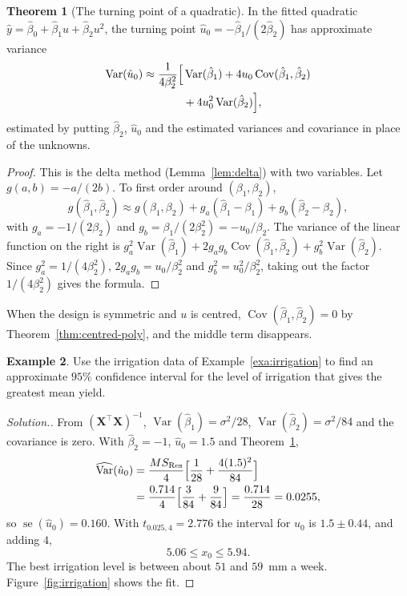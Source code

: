\documentclass[11pt,a4paper]{article}
\numberwithin{equation}{section}
\theoremstyle{definition}
\newtheorem{thm}{Theorem}[subsection]
\newtheorem{exa}[thm]{Example}
\newenvironment{solution}
  {\renewcommand{\qedsymbol}{}\begin{proof}[\textit{Solution}.]}
  {\end{proof}}
\begin{document}
\begin{thm}[The turning point of a quadratic]\label{thm:turning}
In the fitted quadratic $\hat y = \hat\beta_0 + \hat\beta_1u + \hat\beta_2u^2$, the turning point $\hat u_0 = -\hat\beta_1/(2\hat\beta_2)$ has
approximate variance
\begin{align*}
\operatorname{Var}(\hat u_0) \approx \frac{1}{4\beta_2^2}\Bigl[&\operatorname{Var}(\hat\beta_1) + 4u_0\operatorname{Cov}(\hat\beta_1, \hat\beta_2) \\
&+ 4u_0^2\operatorname{Var}(\hat\beta_2)\Bigr] ,
\end{align*}
estimated by putting $\hat\beta_2$, $\hat u_0$ and the estimated variances and covariance in place of the unknowns.
\end{thm}

\begin{proof}
This is the delta method (Lemma~\ref{lem:delta}) with two variables. Let $g(a, b) = -a/(2b)$. To first order
around $(\beta_1, \beta_2)$,
\[
g(\hat\beta_1, \hat\beta_2) \approx g(\beta_1, \beta_2) + g_a(\hat\beta_1 - \beta_1) + g_b(\hat\beta_2 - \beta_2) ,
\]
with $g_a = -1/(2\beta_2)$ and $g_b = \beta_1/(2\beta_2^2) = -u_0/\beta_2$. The variance of the linear function on the right is
$g_a^2\operatorname{Var}(\hat\beta_1) + 2g_ag_b\operatorname{Cov}(\hat\beta_1, \hat\beta_2) + g_b^2\operatorname{Var}(\hat\beta_2)$. Since
$g_a^2 = 1/(4\beta_2^2)$, $2g_ag_b = u_0/\beta_2^2$ and $g_b^2 = u_0^2/\beta_2^2$, taking out the factor $1/(4\beta_2^2)$ gives the formula.
\end{proof}

When the design is symmetric and $u$ is centred, $\operatorname{Cov}(\hat\beta_1, \hat\beta_2) = 0$ by Theorem~\ref{thm:centred-poly}, and the middle
term disappears.

\begin{exa}\label{exa:irrigation-max}
Use the irrigation data of Example~\ref{exa:irrigation} to find an approximate $95\%$ confidence
interval for the level of irrigation that gives the greatest mean yield.
\end{exa}

\begin{solution}
From $(\mathbf{X}^\top\mathbf{X})^{-1}$, $\operatorname{Var}(\hat\beta_1) = \sigma^2/28$, $\operatorname{Var}(\hat\beta_2) = \sigma^2/84$ and the covariance is zero. With
$\hat\beta_2 = -1$, $\hat u_0 = 1.5$ and Theorem~\ref{thm:turning},
\begin{align*}
\widehat{\operatorname{Var}}(\hat u_0) &= \frac{MS_{\mathrm{Res}}}{4}\Bigl[\frac{1}{28} + \frac{4(1.5)^2}{84}\Bigr] \\
&= \frac{0.714}{4}\Bigl[\frac{3}{84} + \frac{9}{84}\Bigr] = \frac{0.714}{28} = 0.0255 ,
\end{align*}
so $\operatorname{se}(\hat u_0) = 0.160$. With $t_{0.025,4} = 2.776$ the interval for $u_0$ is $1.5 \pm 0.44$, and adding $4$,
\[
5.06 \le x_0 \le 5.94 .
\]
The best irrigation level is between about $51$ and $59$~mm a week. Figure~\ref{fig:irrigation} shows the fit.
\end{solution}
\end{document}
